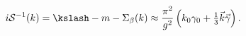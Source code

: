 \begin{equation}
\label{eq:prop_gg}
  i\mathcal{S}^{-1}(k)=\kslash-m-\Sigma_\beta(k)\approx
\frac{\pi^2}{g^2}\left(k_0\gamma_0+\tfrac{1}{3}\vec k\vec\gamma\right).
\end{equation}

